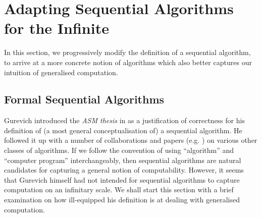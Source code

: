 \documentclass[12pt]{article}
\numberwithin{equation}{section}
\begin{document}
\section{Adapting Sequential Algorithms for the Infinite}\label{sect2}

In this section, we progressively modify the definition of a sequential algorithm, to arrive at a more concrete notion of algorithms which also better captures our intuition of generalised computation. 

\subsection{Formal Sequential Algorithms}

Gurevich introduced the \textit{ASM thesis} in \cite{gurevich} as a justification of correctness for his definition of (a most general conceptualisation of) a sequential algorithm. He followed it up with a number of collaborations and papers (e.g. \cite{gurevichblass}) on various other classes of algorithms. If we follow the convention of using ``algorithm'' and ``computer program'' interchangeably, then sequential algorithms are natural candidates for capturing a general notion of computability. However, it seems that Gurevich himself had not intended for sequential algorithms to capture computation on an infinitary scale. We shall start this section with a brief examination on how ill-equipped his definition is at dealing with generalised computation. 
\end{document}
